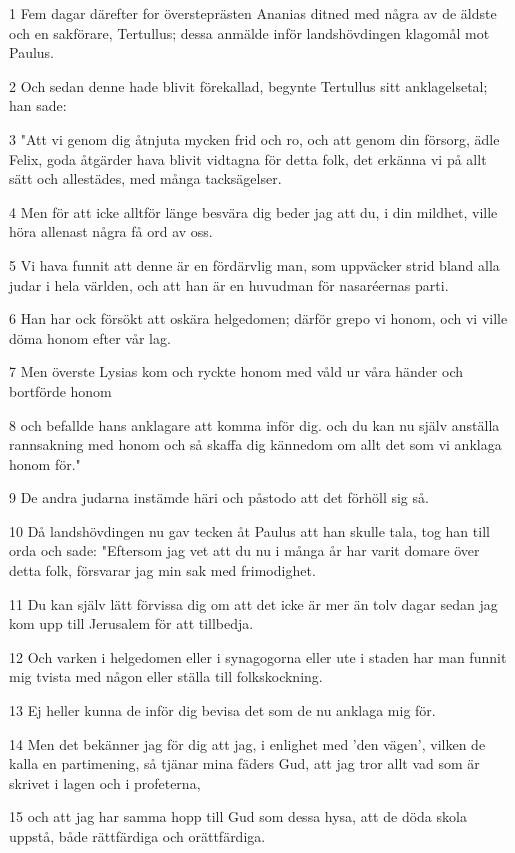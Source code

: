 \par 1 Fem dagar därefter for översteprästen Ananias ditned med några av de äldste och en sakförare, Tertullus; dessa anmälde inför landshövdingen klagomål mot Paulus.
\par 2 Och sedan denne hade blivit förekallad, begynte Tertullus sitt anklagelsetal; han sade:
\par 3 "Att vi genom dig åtnjuta mycken frid och ro, och att genom din försorg, ädle Felix, goda åtgärder hava blivit vidtagna för detta folk, det erkänna vi på allt sätt och allestädes, med många tacksägelser.
\par 4 Men för att icke alltför länge besvära dig beder jag att du, i din mildhet, ville höra allenast några få ord av oss.
\par 5 Vi hava funnit att denne är en fördärvlig man, som uppväcker strid bland alla judar i hela världen, och att han är en huvudman för nasaréernas parti.
\par 6 Han har ock försökt att oskära helgedomen; därför grepo vi honom, och vi ville döma honom efter vår lag.
\par 7 Men överste Lysias kom och ryckte honom med våld ur våra händer och bortförde honom
\par 8 och befallde hans anklagare att komma inför dig. och du kan nu själv anställa rannsakning med honom och så skaffa dig kännedom om allt det som vi anklaga honom för."
\par 9 De andra judarna instämde häri och påstodo att det förhöll sig så.
\par 10 Då landshövdingen nu gav tecken åt Paulus att han skulle tala, tog han till orda och sade: "Eftersom jag vet att du nu i många år har varit domare över detta folk, försvarar jag min sak med frimodighet.
\par 11 Du kan själv lätt förvissa dig om att det icke är mer än tolv dagar sedan jag kom upp till Jerusalem för att tillbedja.
\par 12 Och varken i helgedomen eller i synagogorna eller ute i staden har man funnit mig tvista med någon eller ställa till folkskockning.
\par 13 Ej heller kunna de inför dig bevisa det som de nu anklaga mig för.
\par 14 Men det bekänner jag för dig att jag, i enlighet med 'den vägen', vilken de kalla en partimening, så tjänar mina fäders Gud, att jag tror allt vad som är skrivet i lagen och i profeterna,
\par 15 och att jag har samma hopp till Gud som dessa hysa, att de döda skola uppstå, både rättfärdiga och orättfärdiga.
